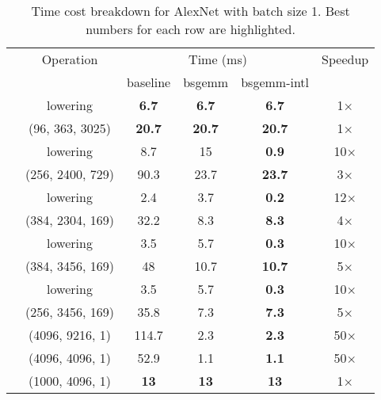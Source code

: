 \documentclass[sigconf]{acmart}
\begin{document}
\begin{table}
	\centering
	\caption{Time cost breakdown for  AlexNet with batch size 1. Best numbers for each row are highlighted.}
	\label{tab:detailedbreakdown}
	\footnotesize
	\begin{tabular}{@{}cccccc@{}}
		\toprule
&		Operation & \multicolumn{3}{c}{Time (ms)} & Speedup \\
		\cmidrule(r){3-5}
&		   & baseline       & bsgemm          & bsgemm-intl             &          \\
		\midrule
		\parbox[t]{2mm}{} &
		lowering & \textbf{6.7} & \textbf{6.7} & \textbf{6.7} & 1$\times$ \\
&		(96, 363, 3025) & \textbf{20.7} & \textbf{20.7} & \textbf{20.7} & 1$\times$ \\
&		lowering & 8.7 & 15 & \textbf{0.9} & 10$\times$ \\
&		(256, 2400, 729) & 90.3 & 23.7 & \textbf{23.7} & 3$\times$ \\
&		lowering & 2.4 & 3.7 & \textbf{0.2} & 12$\times$ \\
&		(384, 2304, 169) & 32.2 & 8.3 & \textbf{8.3} & 4$\times$ \\
&		lowering & 3.5 & 5.7 & \textbf{0.3} & 10$\times$ \\
&		(384, 3456, 169) & 48 & 10.7 & \textbf{10.7} & 5$\times$ \\
&		lowering & 3.5 & 5.7 & \textbf{0.3} & 10$\times$ \\
&		(256, 3456, 169) & 35.8 & 7.3 & \textbf{7.3} & 5$\times$ \\
		\midrule
		\parbox[t]{2mm}{}
&		(4096, 9216, 1)  & 114.7 & 2.3 & \textbf{2.3} & 50$\times$ \\
&		(4096, 4096, 1)  & 52.9 & 1.1 & \textbf{1.1} & 50$\times$ \\
&		(1000, 4096, 1)  & \textbf{13} & \textbf{13} & \textbf{13} & 1$\times$	\\
		\bottomrule

	\end{tabular}
\end{table}
\end{document}
